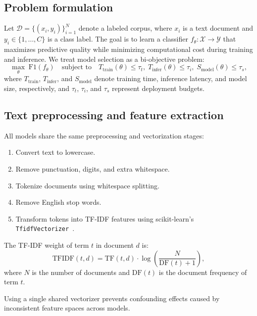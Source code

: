 \documentclass[pdflatex,sn-mathphys-num]{sn-jnl}
\begin{document}
\subsection{Problem formulation}

Let $\mathcal{D}=\{(x_i,y_i)\}_{i=1}^{N}$ denote a labeled corpus, where $x_i$ is a text document and $y_i \in \{1,\ldots,C\}$ is a class label. The goal is to learn a classifier $f_{\theta}:\mathcal{X}\rightarrow\mathcal{Y}$ that maximizes predictive quality while minimizing computational cost during training and inference. We treat model selection as a bi-objective problem:
\begin{equation}
\max_{\theta}\; \mathrm{F1}(f_{\theta}) \quad \text{subject to} \quad T_{\text{train}}(\theta) \le \tau_t,\; T_{\text{infer}}(\theta) \le \tau_i,\; S_{\text{model}}(\theta) \le \tau_s,
\label{eq:objective}
\end{equation}
where $T_{\text{train}}$, $T_{\text{infer}}$, and $S_{\text{model}}$ denote training time, inference latency, and model size, respectively, and $\tau_t$, $\tau_i$, and $\tau_s$ represent deployment budgets.

\subsection{Text preprocessing and feature extraction}

All models share the same preprocessing and vectorization stages:
\begin{enumerate}
    \item Convert text to lowercase.
    \item Remove punctuation, digits, and extra whitespace.
    \item Tokenize documents using whitespace splitting.
    \item Remove English stop words.
    \item Transform tokens into TF-IDF features using scikit-learn's \texttt{TfidfVectorizer}~\cite{pedregosa2011scikit}.
\end{enumerate}

The TF-IDF weight of term $t$ in document $d$ is:
\begin{equation}
\mathrm{TFIDF}(t,d)=\mathrm{TF}(t,d)\cdot \log\!\left(\frac{N}{\mathrm{DF}(t)+1}\right),
\label{eq:tfidf}
\end{equation}
where $N$ is the number of documents and $\mathrm{DF}(t)$ is the document frequency of term $t$.

Using a single shared vectorizer prevents confounding effects caused by inconsistent feature spaces across models.
\end{document}
